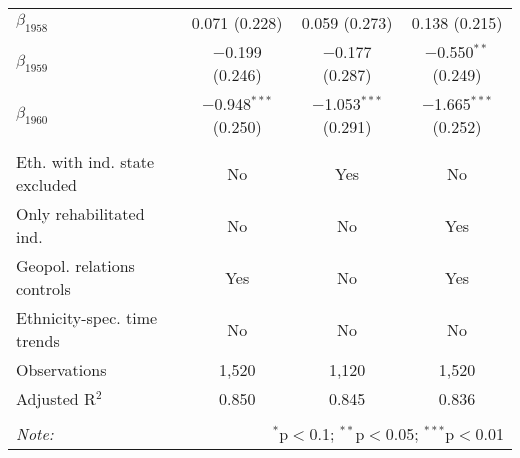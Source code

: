 \begin{table}[!h]
\begin{tabular}{@{\extracolsep{5pt}}lccc}
  $\beta_{1958}$ & 0.071 (0.228) & 0.059 (0.273) & 0.138 (0.215) \\ 
  $\beta_{1959}$ & $-$0.199 (0.246) & $-$0.177 (0.287) & $-$0.550$^{**}$ (0.249) \\ 
  $\beta_{1960}$ & $-$0.948$^{***}$ (0.250) & $-$1.053$^{***}$ (0.291) & $-$1.665$^{***}$ (0.252) \\ 
 \hline \\[-1.8ex] 
Eth. with ind. state excluded & No & Yes & No \\ 
Only rehabilitated ind. & No & No & Yes \\ 
Geopol. relations controls & Yes & No & Yes \\ 
Ethnicity-spec. time trends & No & No & No \\ 
Observations & 1,520 & 1,120 & 1,520 \\ 
Adjusted R$^{2}$ & 0.850 & 0.845 & 0.836 \\ 
\hline 
\hline \\[-1.8ex] 
\textit{Note:}  & \multicolumn{3}{r}{$^{*}$p$<$0.1; $^{**}$p$<$0.05; $^{***}$p$<$0.01} \\ 
\end{tabular} 
\end{table} 
